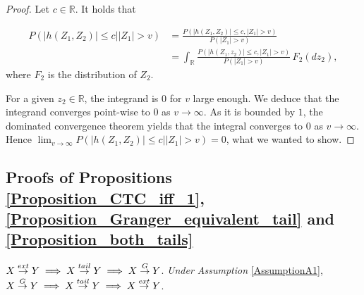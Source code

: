 \documentclass[a4paper,11pt]{article}
\newenvironment{customprop}[1]
  {\renewcommand\theinnercustomprop{#1}\innercustomprop}
  {\endinnercustomprop}
\newcommand{\toverset}[2]{\overset{{\rm #1}}{#2}}
\begin{document}
\begin{proof}
Let $c\in\mathbb R$. It holds that

\begin{align*}
 P(|h(Z_1,Z_2)|\leq c\vert |Z_1|>v)&=\frac{ P(|h(Z_1,Z_2)|\leq c,|Z_1|>v)}{ P(|Z_1|>v)}\\
&=\int_{\mathbb{R}}\frac{ P(|h(Z_1,z_2)|\leq c,|Z_1|>v)}{ P(|Z_1|>v)}\,F_{2}(dz_2),
\end{align*}
where $F_2$ is the distribution of $Z_2$.


For a given $z_2\in\mathbb{R}$, the integrand is $0$ for $v$ large enough. We deduce that the integrand converges point-wise to $0$ as $v\to \infty$. As it is bounded by $1$, the dominated convergence theorem yields that the integral converges to $0$ as $v\to\infty$. Hence $\lim_{v\to\infty} P(|h(Z_1,Z_2)|\leq c\vert |Z_1|>v) = 0$, what we wanted to show. 
\end{proof}



\subsection{Proofs of Propositions \ref{Proposition_CTC_iff_1},  \ref{Proposition_Granger_equivalent_tail} and \ref{Proposition_both_tails}}
\label{Proof_of_propositions_1_and_2}


\begin{customprop}{\ref{Proposition_CTC_iff_1} and  \ref{Proposition_Granger_equivalent_tail}}
$X\toverset{ext}{\to}Y \implies X\toverset{tail}{\to}Y \implies X\toverset{G}{\to}Y$. \textit{Under Assumption} \ref{AssumptionA1},   $X\toverset{G}{\to}Y \implies X\toverset{tail}{\to}Y \implies X\toverset{ext}{\to}Y$. 
\end{customprop}
\end{document}
